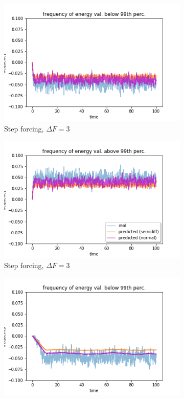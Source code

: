 \documentclass{article}
\begin{document}
\begin{figure}[!ht]
	\centering
	\begin{subfigure}[b]{0.48\textwidth}
		\includegraphics[width=1\linewidth]{fig/pred_energy_bin_00q_099q_S_30.png}
		\caption{Step forcing, $\Delta F=3$}
		\label{fig:pred_energy_bin_00q_099q_S_30}
	\end{subfigure}%
	\begin{subfigure}[b]{0.48\textwidth}
		\includegraphics[width=1\linewidth]{fig/pred_energy_exceed_099q_S_30.png}
		\caption{Step forcing, $\Delta F=3$}
		\label{fig:pred_energy_exceed_099q_S_30}
	\end{subfigure}
	\begin{subfigure}[b]{0.48\textwidth}
		\includegraphics[width=1\linewidth]{fig/pred_energy_bin_00q_099q_L_03_10.png}

\end{subfigure}
\end{figure}
\end{document}

